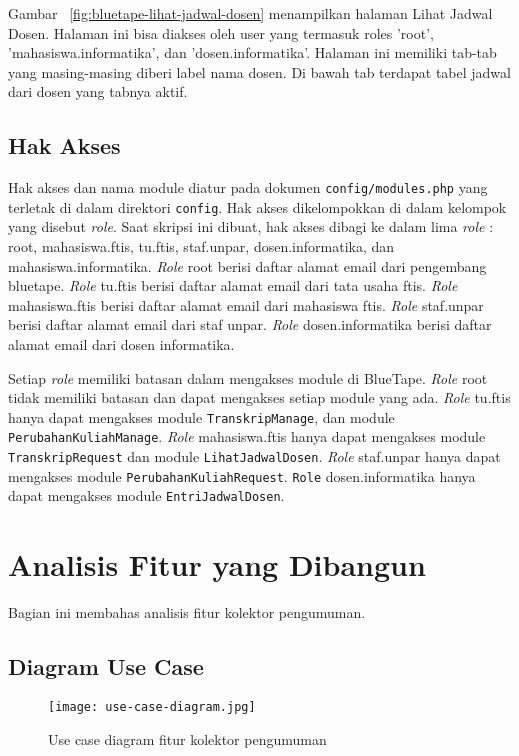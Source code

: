 	Gambar~ \ref{fig:bluetape-lihat-jadwal-dosen} menampilkan halaman Lihat Jadwal Dosen. Halaman ini bisa diakses oleh user yang termasuk roles 'root', 'mahasiswa.informatika', dan 'dosen.informatika'. Halaman ini memiliki tab-tab yang masing-masing diberi label nama dosen. Di bawah tab terdapat tabel jadwal dari dosen yang tabnya aktif.

\subsection{Hak Akses}
	Hak akses dan nama module diatur pada dokumen \texttt{config/modules.php} yang terletak di dalam direktori \texttt{config}. Hak akses dikelompokkan di dalam kelompok yang disebut \textit{role}. Saat skripsi ini dibuat, hak akses dibagi ke dalam lima \textit{role} : root, mahasiswa.ftis, tu.ftis, staf.unpar, dosen.informatika, dan mahasiswa.informatika. \textit{Role} root berisi daftar alamat email dari pengembang bluetape. \textit{Role} tu.ftis berisi daftar alamat email dari tata usaha ftis. \textit{Role} mahasiswa.ftis berisi daftar alamat email dari mahasiswa ftis. \textit{Role} staf.unpar berisi daftar alamat email dari staf unpar. \textit{Role} dosen.informatika berisi daftar alamat email dari dosen informatika.

	Setiap \textit{role} memiliki batasan dalam mengakses module di BlueTape. \textit{Role} root tidak memiliki batasan dan dapat mengakses setiap module yang ada. \textit{Role} tu.ftis hanya dapat mengakses module \texttt{TranskripManage}, dan module \texttt{PerubahanKuliahManage}. \textit{Role} mahasiswa.ftis hanya dapat mengakses module \texttt{TranskripRequest} dan module \texttt{LihatJadwalDosen}. \textit{Role} staf.unpar hanya dapat mengakses module \texttt{PerubahanKuliahRequest}. \texttt{Role} dosen.informatika hanya dapat mengakses module \texttt{EntriJadwalDosen}.

\section{Analisis Fitur yang Dibangun}
\label{sec:analisisYangDibangun}
	Bagian ini membahas analisis fitur kolektor pengumuman.

\subsection{Diagram Use Case}
\begin{figure}[H]
	\centering  
	\texttt{[image: use-case-diagram.jpg]}  
	\caption[Use case diagram fitur kolektor pengumuman]{Use case diagram fitur kolektor pengumuman} 
	\label{fig:use-case-diagram} 
\end{figure}

